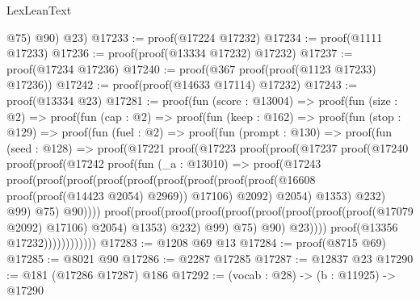 \begin{lexlean}{LexLeanText}
\begin{coremodule}
          @75)
        @90)
      @23)
@17233 := proof(@17224 @17232)
@17234 := proof(@1111 @17233)
@17236 := proof(proof(@13334 @17232) @17232)
@17237 := proof(@17234 @17236)
@17240 := proof(@367 proof(proof(@1123 @17233) @17236))
@17242 := proof(proof(@14633 @17114) @17232)
@17243 := proof(@13334 @23)
@17281 := proof(fun (score : @13004) =>
    proof(fun (size : @2) =>
      proof(fun (cap : @2) =>
        proof(fun (keep : @162) =>
          proof(fun (stop : @129) =>
            proof(fun (fuel : @2) =>
              proof(fun (prompt : @130) =>
                proof(fun (seed : @128) =>
                  proof(@17221
                      proof(@17223
                          proof(proof(@17237
                                proof(@17240
                                    proof(proof(@17242
                                          proof(fun (_a : @13010) =>
                                            proof(@17243
                                                proof(proof(proof(proof(proof(proof(proof(proof(proof(@16608
                                                                    proof(proof(@14423 @2054)
                                                                        @2969))
                                                                  @17106)
                                                                @2092)
                                                              @2054)
                                                            @1353)
                                                          @232)
                                                        @99)
                                                      @75)
                                                    @90))))
                                        proof(proof(proof(proof(proof(proof(proof(proof(proof(@17079
                                                            @2092)
                                                          @17106)
                                                        @2054)
                                                      @1353)
                                                    @232)
                                                  @99)
                                                @75)
                                              @90)
                                            @23))))
                              proof(@13356 @17232))))))))))))
@17283 := @1208 @69 @13
@17284 := proof(@8715 @69)
@17285 := @8021 @90
@17286 := @2287 @17285
@17287 := @12837 @23
@17290 := @181 (@17286 @17287) @186
@17292 := (vocab : @28) -> (b : @11925) -> @17290

\end{coremodule}
\end{lexlean}
